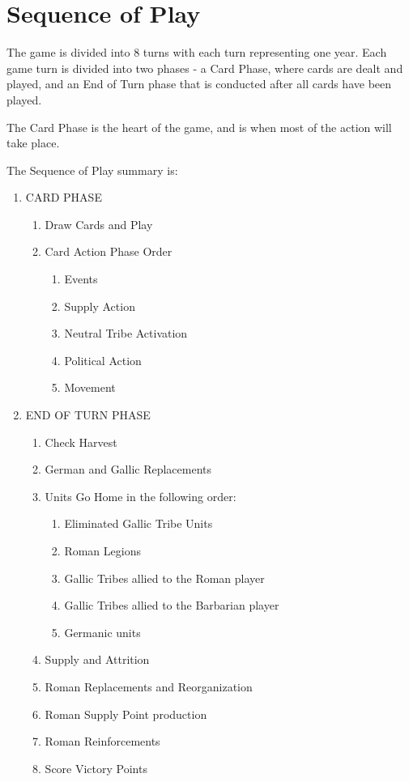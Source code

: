 \section{Sequence of Play}

The game is divided into 8 turns with each turn representing one year. Each game turn is divided into two phases - a Card Phase, where cards are dealt and played, and an End of Turn phase that is conducted after all cards have been played.

The Card Phase is the heart of the game, and is when most of the action will take place.

The Sequence of Play summary is:

\begin{samepage}
\renewcommand{\labelenumii}{\Alph{enumii}.}
\begin{enumerate}
    \item CARD PHASE
    \begin{enumerate}
        \item Draw Cards and Play
        \item Card Action Phase Order
        \begin{enumerate}
            \item Events
            \item Supply Action
            \item Neutral Tribe Activation
            \item Political Action
            \item Movement
        \end{enumerate}
    \end{enumerate}
    \item END OF TURN PHASE
    \begin{enumerate}
        \item Check Harvest
        \item German and Gallic Replacements
        \item Units Go Home in the following order:
        \begin{enumerate}
            \item Eliminated Gallic Tribe Units
            \item Roman Legions
            \item Gallic Tribes allied to the Roman player
            \item Gallic Tribes allied to the Barbarian player
            \item Germanic units
        \end{enumerate}
        \item Supply and Attrition
        \item Roman Replacements and Reorganization
        \item Roman Supply Point production
        \item Roman Reinforcements
        \item Score Victory Points
    \end{enumerate}
\end{enumerate}
\end{samepage}